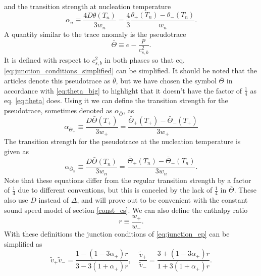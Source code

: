 and the transition strength at nucleation temperature
\cite[eq. 2.11]{hindmarsh_gw_pt_2019}
\begin{equation}
\alpha_n
\equiv \frac{4D\theta(T_n)}{3w_n}
= \frac{4}{3} \frac{\theta_+(T_n) - \theta_-(T_n)}{w_n}.
\label{eq:alpha_n}
\end{equation}
A quantity similar to the trace anomaly is the pseudotrace
\cites[eq. 34]{giese_2020}[eq. 1]{giese_2021}
\begin{equation}
\bar{\Theta} \equiv e - \frac{p}{c_{s,b}^2}.
\label{eq:theta_bar}
\end{equation}
It is defined with respect to $c_{s,b}^2$ in both phases so that eq. \ref{eq:junction_conditions_simplified} can be simplified.
It should be noted that the articles \cites{giese_2020}{giese_2021} denote this pseudotrace as $\bar{\theta}$,
but we have chosen the symbol $\bar{\Theta}$ in accordance with \eqref{eq:theta_big} to highlight that it doesn't have the factor of $\frac{1}{4}$ as eq. \eqref{eq:theta} does.
Using it we can define the transition strength for the pseudotrace,
sometimes denoted as $\alpha_{\bar{\Theta}}$, as
\cites[eq. 34]{giese_2020}[eq. 1]{giese_2021}
\begin{equation}
\alpha_{\bar{\Theta}_+}
\equiv \frac{D \bar{\Theta}(T_+)}{3w_+}
= \frac{\bar{\Theta}_+(T_+) - \bar{\Theta}_-(T_+)}{3w_+}
\label{eq:alpha_theta_bar_plus}
\end{equation}
The transition strength for the pseudotrace at the nucleation temperature is given as
\begin{equation}
\alpha_{\bar{\Theta}_n}
\equiv \frac{D \bar{\Theta}(T_n)}{3w_n}
= \frac{\bar{\Theta}_+(T_n) - \bar{\Theta}_-(T_n)}{3w_n}.
\label{eq:alpha_theta_bar_n}
\end{equation}
Note that these equations differ from the regular transition strength by a factor of $\frac{1}{4}$ due to different conventions, but this is canceled by the lack of $\frac{1}{4}$ in $\bar{\Theta}$.
These also use $D$ instead of $\Delta$,
and will prove out to be convenient with the constant sound speed model of section \ref{const_cs}.
We can also define the enthalpy ratio
\begin{equation}
r \equiv \frac{w_+}{w_-}.
\end{equation}
With these definitions the junction conditions of \eqref{eq:junction_ep} can be simplified as
\begin{equation}
\tilde{v}_+ \tilde{v}_- = \frac{1-(1-3\alpha_+)r}{3-3(1+\alpha_+)r},
\quad
\frac{\tilde{v}_+}{\tilde{v}_-} = \frac{3+(1-3\alpha_+)r}{1+3(1+\alpha_+)r}.
\label{eq:junction_conditions_simplified}
\end{equation}
